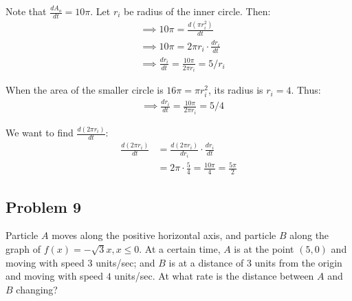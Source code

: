 Note that $\frac{dA_o}{dt}=10\pi$. Let $r_i$ be radius of the inner
circle. Then:
\begin{align*}
  &\implies 10\pi=\frac{d(\pi r_i^2)}{dt}\\
  &\implies 10\pi=2\pi r_i\cdot \frac{dr_i}{dt}\\
  &\implies \frac{dr_i}{dt}=\frac{10\pi}{2\pi r_i}=5/r_i
\end{align*}

When the area of the smaller circle is $16\pi=\pi r_i^2$, its radius is
$r_i=4$. Thus:
\begin{align*}
  &\implies \frac{dr_i}{dt}=\frac{10\pi}{2\pi r_i}=5/4
\end{align*}

We want to find $\frac{d(2\pi r_i)}{dt}$:
\begin{align*}
  \frac{d(2\pi r_i)}{dt}&=\frac{d(2\pi r_i)}{dr_i}\cdot \frac{dr_i}{dt}\\
                      &=2\pi\cdot \frac{5}{4}=\frac{10\pi}{4}=\frac{5\pi}{2}
\end{align*}

\subsection*{Problem 9}
Particle $A$ moves along the positive horizontal axis, and particle
$B$ along the graph of $f(x)=-\sqrt{3}x,x\leq0$. At a certain time,
$A$ is at the point $(5,0)$ and moving with speed $3$ units/sec; and
$B$ is at a distance of 3 units from the origin and moving with speed
$4$ units/sec. At what rate is the distance between $A$ and $B$
changing?


